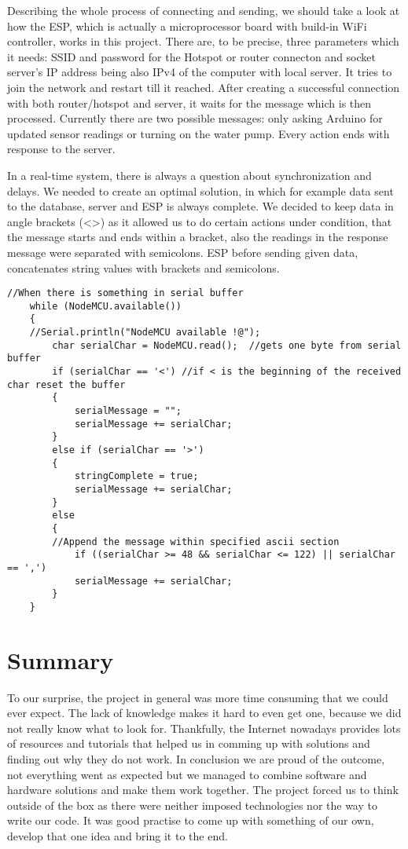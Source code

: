 \documentclass[oneside,a4paper,11pt]{report}
\begin{document}
\hspace{0.5cm}Describing the whole process of connecting and sending, we should take a look at how the ESP, which is actually a microprocessor board with build-in WiFi controller, works in this project. There are, to be precise, three parameters which it needs: SSID and password for the Hotspot or router connecton and socket server's IP address being also IPv4 of the computer with local server. It tries to join the network and restart till it reached. After creating a successful connection with both router/hotspot and server, it waits for the message which is then processed. Currently there are two possible messages: only asking Arduino for updated sensor readings or turning on the water pump. Every action ends with response to the server.\par
\hspace{0.5cm}In a real-time system, there is always a question about synchronization and delays. We needed to create an optimal solution, in which for example data sent to the database, server and ESP is always complete. We decided to keep data in angle brackets (<>) as it allowed us to do certain actions under condition, that the message starts and ends within a bracket, also the readings in the response message were separated with semicolons. ESP before sending given data, concatenates string values with brackets and semicolons.
\begin{lstlisting}[style=CStyle]
 //When there is something in serial buffer
	while (NodeMCU.available()) 
	{
	//Serial.println("NodeMCU available !@");
		char serialChar = NodeMCU.read();  //gets one byte from serial buffer
		if (serialChar == '<') //if < is the beginning of the received char reset the buffer
		{
			serialMessage = "";
			serialMessage += serialChar;
		}
		else if (serialChar == '>') 
		{
			stringComplete = true;
			serialMessage += serialChar;
		}
		else
		{
		//Append the message within specified ascii section 
			if ((serialChar >= 48 && serialChar <= 122) || serialChar == ',') 
			serialMessage += serialChar;
		}               
	}
\end{lstlisting}

\chapter{Summary}
\hspace{1cm}To our surprise, the project in general was more time consuming that we could ever expect. The lack of knowledge makes it hard to even get one, because we did not really know what to look for. Thankfully, the Internet nowadays provides lots of resources and tutorials that helped us in comming up with solutions and finding out why they do not work. In conclusion we are proud of the outcome, not everything went as expected but we managed to combine software and hardware solutions and make them work together. 
The project forced us to think outside of the box as there were neither imposed technologies nor the way to write our code. It was good practise to come up with something of our own, develop that one idea and bring it to the end.
\end{document}
